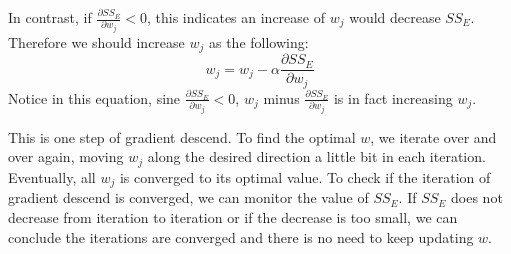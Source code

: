 \documentclass[
	letterpaper
]{article}
\begin{document}
In contrast, if $\frac{\partial SS_E}{\partial w_j} < 0$, this indicates an increase of $w_j$ would decrease $SS_E$.
Therefore we should increase $w_j$ as the following:
\begin{equation}
w_j = w_j - \alpha \frac{\partial SS_E}{\partial w_j} 
\end{equation}
Notice in this equation, sine $\frac{\partial SS_E}{\partial w_j} < 0$, $w_j$ minus $\frac{\partial SS_E}{\partial w_j}$ is in fact increasing $w_j$.

This is one step of gradient descend. 
To find the optimal $w$, we iterate over and over again, moving $w_j$ along the desired direction a little bit in each iteration.
Eventually, all $w_j$ is converged to its optimal value.
To check if the iteration of gradient descend is converged, we can monitor the value of $SS_E$.
If $SS_E$ does not decrease from iteration to iteration or if the decrease is too small, we can conclude the iterations are converged and there is no need to keep updating $w$.
\end{document}

